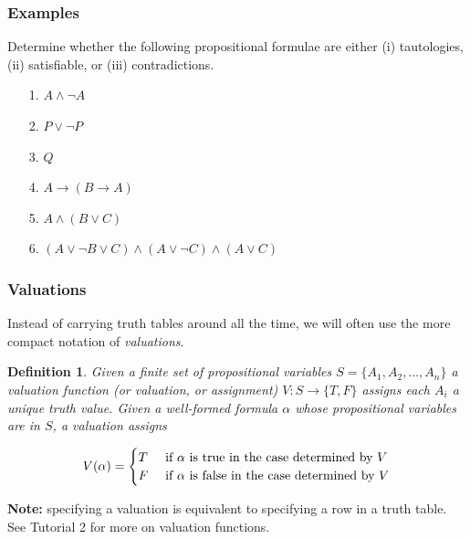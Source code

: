 \documentclass{beamer}
\theoremstyle{indentDefn} \newtheorem{defn}[]{Definition}
\begin{document}
\begin{frame}
	\frametitle{Examples}
	
	Determine whether the following propositional formulae are either (i) tautologies, (ii) satisfiable, or (iii) contradictions.
	
	\vspace{1cm}
	
	\begin{itemize}
		\item[1.] $A \land \lnot A$
		\item[2.] $P \lor \lnot P$
		\item[3.] $Q$
		\item[4.] $A \rightarrow (B \rightarrow A)$
		\item[5.] $A \land (B \lor C)$
		\item[6.] $(A \lor \lnot B \lor C) \land (A \lor \lnot C) \land (A \lor C ) $
	\end{itemize}
	
\end{frame}


	
%	
%	
%	

\begin{frame}
	\frametitle{Valuations}
	
	Instead of carrying truth tables around all the time, we will often use the more compact notation of \emph{valuations}. 
	
	\begin{defn}
		 Given a finite set of propositional variables $S = \{A_{1},A_{2}, \dots, A_{n}\}$ a valuation function (or \emph{valuation}, or \emph{assignment}) $V:S \rightarrow \{T,F\}$ assigns each $A_{i}$ a unique truth value. Given a well-formed formula $\alpha$ whose propositional variables are in $S$, a valuation assigns 
	
		$$ V(\alpha) = \begin{cases} 
				T & \textnormal{ if $\alpha$ is true in the case determined by $V$} \\
				F & \textnormal{ if $\alpha$ is false in the case determined by $V$} 
			   \end{cases}$$
	\end{defn}

	\vspace{0.5cm}
			   

	
	{\bf Note:} specifying a valuation is equivalent to specifying a row in a truth table. 	See Tutorial 2 for more on valuation functions.
	
\end{frame}
\end{document}
